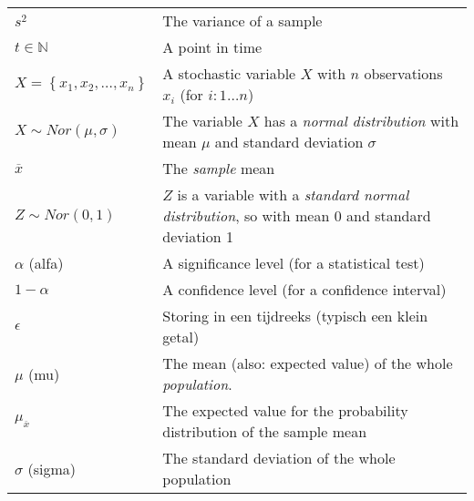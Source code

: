 \begin{table}
\begin{tabular}{p{}p{}}
  	$s^2$                                                   & The variance of a sample                                                                                                          \\
  	$t \in \mathbb{N}$                                      & A point in time                                                                                                                   \\
  	$X = \left\{x_1, x_2, \ldots, x_n \right\}$             & A stochastic variable $X$ with $n$ observations $x_i$ (for $i: 1 \ldots n$)                                                       \\
  	$X \sim Nor(\mu, \sigma)$                               & The variable $X$ has a \emph{normal distribution} with mean $\mu$ and standard deviation $\sigma$                                 \\
  	$\overline{x}$                                          & The \emph{sample} mean                                                                                                            \\
  	$Z \sim Nor(0, 1)$                                      & $Z$ is a variable with a \emph{standard normal distribution}, so with mean 0 and standard deviation 1                             \\
  	\midrule
  	$\alpha$ (alfa)                                         & A significance level (for a statistical test)                                                                                     \\
  	$1 - \alpha$                                            & A confidence level (for a confidence interval)                                                                                    \\
  	$\epsilon$                                              & Storing in een tijdreeks (typisch een klein getal)                                                                                \\
  	$\mu$ (mu)                                              & The mean (also: expected value) of the whole \emph{population}.                                                                   \\
  	$\mu_{\overline{x}}$                                    & The expected value for the probability distribution of the sample mean                                                            \\
  	$\sigma$ (sigma)                                        & The standard deviation of the whole population                                                                                    \\

\end{tabular}
\end{table}
